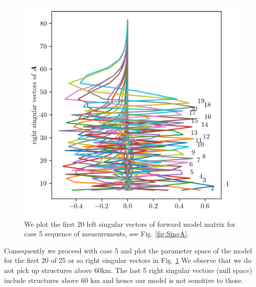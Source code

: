 \begin{figure}[ht!]
	\centering
	\includegraphics{SingVecA.png}
	\caption[Left singular vectors of forward model matrix for one sequence of measurements.]{We plot the first 20 left singular vectors of forward model matrix for case 5 sequence of measurements, see Fig. \ref{fig:SingA}.}
	\label{fig:SingVecA}
\end{figure}
\begin{figure}[ht!]
	\centering
	\caption[]{}
	\label{fig:nullSpace}
\end{figure}
Consequently we proceed with case 5 and plot the parameter space of the model for the first 20 of 25 or so right singular vectors in Fig. \ref{fig:SingVecA}
We observe that we do not pick up structures above 60km.
The last 5 right singular vectors (null space) include structures above 60 km and hence our model is not sensitive to those.








